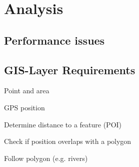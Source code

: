 
\chapter{Analysis}



\section{Performance issues}


\section{GIS-Layer Requirements}
\reqstartF
	\item Point and area
	\item GPS position
	\item Determine distance to a feature (POI)
	\item Check if position overlaps with a polygon
	\item Follow polygon (e.g. rivers)
\reqendF